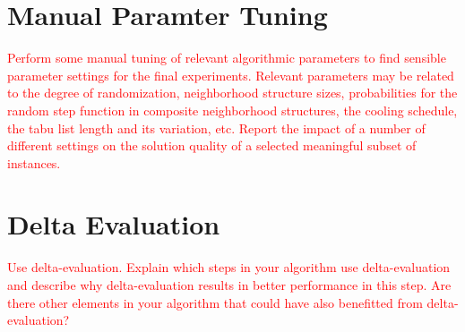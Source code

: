 \section{Manual Paramter Tuning}
\textcolor{red}{
Perform some manual tuning of relevant algorithmic parameters to find sensible parameter settings
for the final experiments. Relevant parameters may be related to the degree of randomization,
neighborhood structure sizes, probabilities for the random step function in composite neighborhood
structures, the cooling schedule, the tabu list length and its variation, etc. Report the impact of a
number of different settings on the solution quality of a selected meaningful subset of instances.}

\pagebreak

\section{Delta Evaluation}
\textcolor{red}{Use delta-evaluation.
Explain which steps in your algorithm use delta-evaluation and describe
why delta-evaluation results in better performance in this step. Are there other elements in your
algorithm that could have also benefitted from delta-evaluation?}
